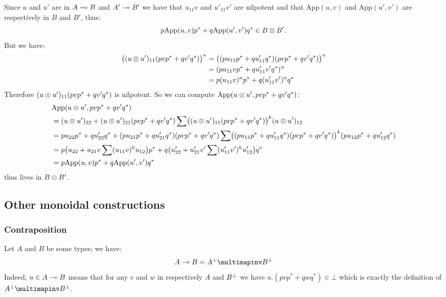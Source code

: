 Since \(u\) and \(u'\) are in \(A\multimap B\) and \(A'\multimap B'\) we have
that \(u_{11}v\) and \(u'_{11}v'\) are nilpotent and that
\(\mathrm{App}(u, v)\) and \(\mathrm{App}(u', v')\) are respectively in
\(B\) and \(B'\), thus:
\begin{equation*}
p\mathrm{App}(u, v)p^* + q\mathrm{App}(u', v')q^* \in B\otimes B'.
\end{equation*}
But we have:
\begin{align*}
    \bigl((u\otimes u')_{11}(pvp^* + qv'q^*)\bigr)^n
      & = \bigl((pu_{11}p^* + qu'_{11}q^*)(pvp^* + qv'q^*)\bigr)^n\\
      & = (pu_{11}vp^* + qu'_{11}v'q^*)^n\\
      & = p(u_{11}v)^np^* + q(u'_{11}v')^nq^*
\end{align*}
Therefore \((u\otimes u')_{11}(pvp^* + qv'q^*)\) is nilpotent. So we can
compute \(\mathrm{App}(u\otimes u', pvp^* + qv'q^*)\):
\begin{align*}
    & \mathrm{App}(u\otimes u', pvp^* + qv'q^*)\\
      & = (u\otimes u')_{22} + (u\otimes u')_{21}(pvp^* + qv'q^*)\sum\bigl((u\otimes u')_{11}(pvp^* + qv'q^*)\bigr)^k(u\otimes u')_{12}\\
      & = pu_{22}p^* + qu'_{22}q^* + (pu_{21}p^* + qu'_{21}q^*)(pvp^* + qv'q^*)\sum\bigl((pu_{11}p^* + qu'_{11}q^*)(pvp^* + qv'q^*)\bigr)^k(pu_{12}p^* + qu'_{12}q^*)\\
      & = p\bigl(u_{22} + u_{21}v\sum(u_{11}v)^ku_{12}\bigr)p^* + q\bigl(u'_{22} + u'_{21}v'\sum(u'_{11}v')^ku'_{12}\bigr)q^*\\
      & = p\mathrm{App}(u, v)p^* + q\mathrm{App}(u', v')q^*
\end{align*}
thus lives in \(B\otimes B'\).

\subsection{Other monoidal constructions}\label{other-monoidal-constructions}

\subsubsection{Contraposition}\label{contraposition}

Let \(A\) and \(B\) be some types; we have:
\begin{equation*}
A\limp B = A\orth\limpinv B\orth
\end{equation*}
Indeed, \(u\in A\multimap B\) means that for any \(v\) and \(w\) in
respectively \(A\) and \(B^\bot\) we have \(u.(pvp^* + qwq^*)\in\bot\)
which is exactly the definition of \(A\orth\limpinv B\orth\).

